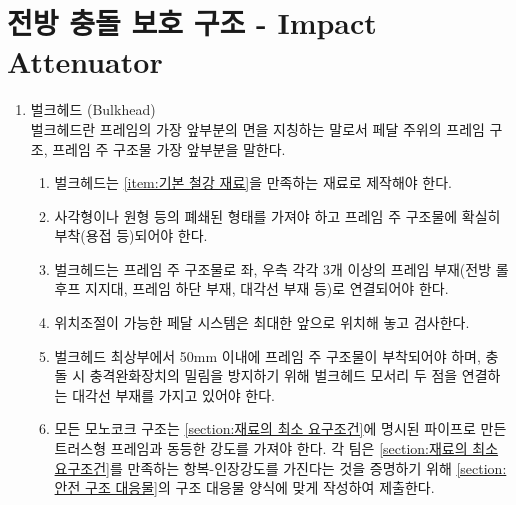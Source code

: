 \documentclass[final,a4paper,10pt]{report}
\begin{document}
\section{전방 충돌 보호 구조 - Impact Attenuator}
\begin{enumerate}
  \item 벌크헤드 (Bulkhead)\\ \label{item:벌크헤드}
    벌크헤드란 프레임의 가장 앞부분의 면을 지칭하는 말로서 페달 주위의 프레임 구조, 프레임 주 구조물 가장 앞부분을 말한다. 
    \begin{enumerate}
      \item 벌크헤드는 \cref{item:기본 철강 재료}을 만족하는 재료로 제작해야 한다.
      \item 사각형이나 원형 등의 폐쇄된 형태를 가져야 하고 프레임 주 구조물에 확실히 부착(용접 등)되어야 한다.
      \item 벌크헤드는 프레임 주 구조물로 좌, 우측 각각 3개 이상의 프레임 부재(전방 롤 후프 지지대, 프레임 하단 부재, 대각선 부재 등)로 연결되어야 한다.
      \item 위치조절이 가능한 페달 시스템은 최대한 앞으로 위치해 놓고 검사한다.
      \item 벌크헤드 최상부에서 50mm 이내에 프레임 주 구조물이 부착되어야 하며, 충돌 시 충격완화장치의 밀림을 방지하기 위해 벌크헤드 모서리 두 점을 연결하는 대각선 부재를 가지고 있어야 한다.
      \item 모든 모노코크 구조는 \cref{section:재료의 최소 요구조건}에 명시된 파이프로 만든 트러스형 프레임과 동등한 강도를 가져야 한다. 각 팀은 \cref{section:재료의 최소 요구조건}를 만족하는 항복-인장강도를 가진다는 것을 증명하기 위해 \cref{section:안전 구조 대응물}의 구조 대응물 양식에 맞게 작성하여 제출한다. \label{item:모노코크 벌크헤드}
    \end{enumerate}
    

\end{enumerate}
\end{document}
